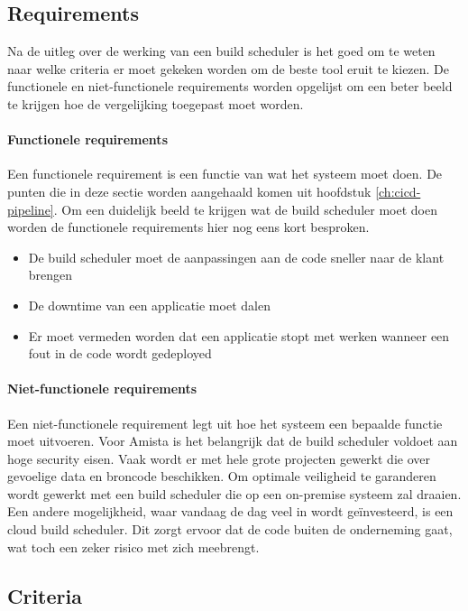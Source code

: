         
        
        \subsection{Requirements}
        Na de uitleg over de werking van een build scheduler is het goed om te weten naar welke criteria er moet gekeken worden om de beste tool eruit te kiezen. De functionele en niet-functionele requirements worden opgelijst om een beter beeld te krijgen hoe de vergelijking toegepast moet worden.

            \paragraph{Functionele requirements}
            Een functionele requirement is een functie van wat het systeem moet doen.
            De punten die in deze sectie worden aangehaald komen uit hoofdstuk \ref{ch:cicd-pipeline}. Om een duidelijk beeld te krijgen wat de build scheduler moet doen worden de functionele requirements hier nog eens kort besproken.
            \begin{itemize}
                \item De build scheduler moet de aanpassingen aan de code sneller naar de klant brengen
                \item De downtime van een applicatie moet dalen
                \item Er moet vermeden worden dat een applicatie stopt met werken wanneer een fout in de code wordt gedeployed
            \end{itemize}
            
            \paragraph{Niet-functionele requirements}
            Een niet-functionele requirement legt uit hoe het systeem een bepaalde functie moet uitvoeren. Voor Amista is het belangrijk dat de build scheduler voldoet aan hoge security eisen. Vaak wordt er met hele grote projecten gewerkt die over gevoelige data en broncode beschikken. Om optimale veiligheid te garanderen wordt gewerkt met een build scheduler die op een on-premise systeem zal draaien. Een andere mogelijkheid, waar vandaag de dag veel in wordt geïnvesteerd, is een cloud build scheduler. Dit zorgt ervoor dat de code buiten de onderneming gaat, wat toch een zeker risico met zich meebrengt.

        \subsection{Criteria}
